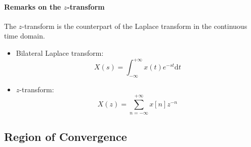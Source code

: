 \paragraph{Remarks on the $z$-transform} The $z$-transform is the counterpart of the Laplace transform in the continuous time domain.
\begin{itemize}
    \item Bilateral Laplace transform:
    \[
        X(s) = \int_{-\infty}^{+\infty} x(t) e^{-st} \mathrm{d}t
    \]
    \item $z$-transform:
    \[
        X(z) = \sum_{n=-\infty}^{+\infty} x[n] z^{-n}
    \]
\end{itemize}


\subsection{Region of Convergence}

